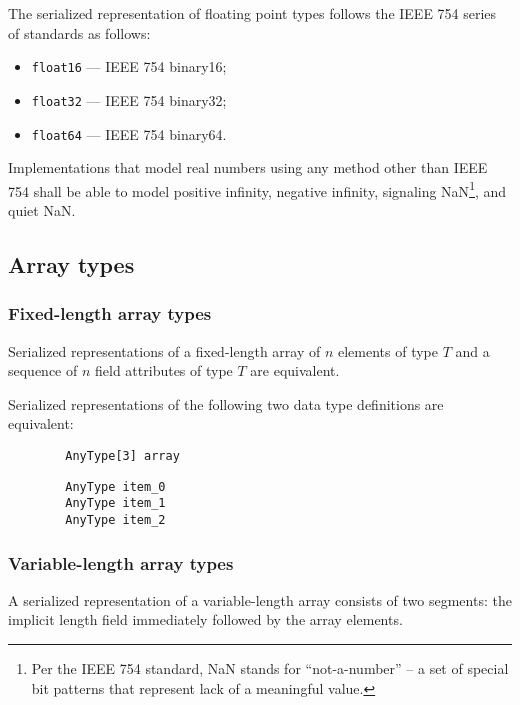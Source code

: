 The serialized representation of floating point types follows the IEEE 754 series of standards as follows:

\begin{itemize}
    \item \verb|float16| --- IEEE 754 binary16;
    \item \verb|float32| --- IEEE 754 binary32;
    \item \verb|float64| --- IEEE 754 binary64.
\end{itemize}

Implementations that model real numbers using any method other than IEEE 754 shall be able to model
positive infinity, negative infinity, signaling NaN\footnote{%
    Per the IEEE 754 standard, NaN stands for
    ``not-a-number'' -- a set of special bit patterns that represent lack of a meaningful value.
}, and quiet NaN.

\subsection{Array types}

\subsubsection{Fixed-length array types}

Serialized representations of a fixed-length array of $n$ elements of type $T$ and
a sequence of $n$ field attributes of type $T$ are equivalent.

\begin{remark}
    Serialized representations of the following two data type definitions are equivalent:

    \begin{verbatim}
        AnyType[3] array
    \end{verbatim}

    \begin{verbatim}
        AnyType item_0
        AnyType item_1
        AnyType item_2
    \end{verbatim}
\end{remark}

\subsubsection{Variable-length array types}\label{sec:dsdl_serialized_variable_length_array}

A serialized representation of a variable-length array consists of two segments:
the implicit length field immediately followed by the array elements.

